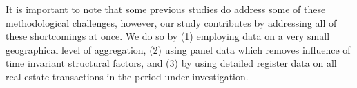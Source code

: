 \documentclass[12pt,a4paper]{article}
\begin{document}
It is important to note that some previous studies do  address some of these methodological challenges, however, our study contributes by addressing all of these shortcomings at once. We do so by (1) employing data on a very small geographical level of aggregation, (2) using panel data which removes influence of time invariant structural factors, and (3) by using detailed register data on all real estate transactions in the period under investigation.









\end{document}

